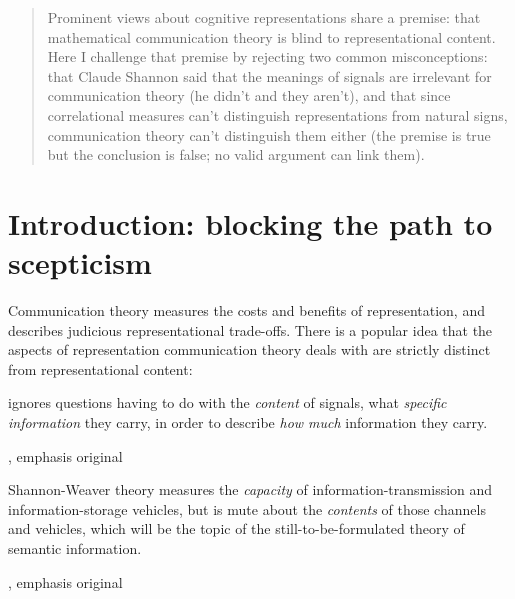 \documentclass[12pt]{article}
\begin{document}
\maketitle


\begin{abstract}
\noindent Prominent views about cognitive representations share a premise: that mathematical communication theory is blind to representational content. Here I challenge that premise by rejecting two common misconceptions: that Claude Shannon said that the meanings of signals are irrelevant for communication theory (he didn't and they aren't), and that since correlational measures can't distinguish representations from natural signs, communication theory can't distinguish them either (the premise is true but the conclusion is false; no valid argument can link them).
\end{abstract}

\section{Introduction: blocking the path to scepticism}\label{sec:intro}

Communication theory measures the costs and benefits of representation, and describes judicious representational trade-offs. 
There is a popular idea that the aspects of representation communication theory deals with are strictly distinct from representational content:

\begin{myquote}
 ignores questions having to do with the \emph{content} of signals, what \emph{specific information} they carry, in order to describe \emph{how much} information they carry.
\par\hspace*{\fill}\citet[41]{dretske1981knowledge}, emphasis original
\end{myquote}

\begin{myquote}
Shannon-Weaver theory measures the \emph{capacity} of information-transmission and information-storage vehicles, but is mute about the \emph{contents} of those channels and vehicles, which will be the topic of the still-to-be-formulated theory of semantic information.
\par\hspace*{\fill}\citet[344]{dennett1983intentional}, emphasis original
\end{myquote}
\end{document}
